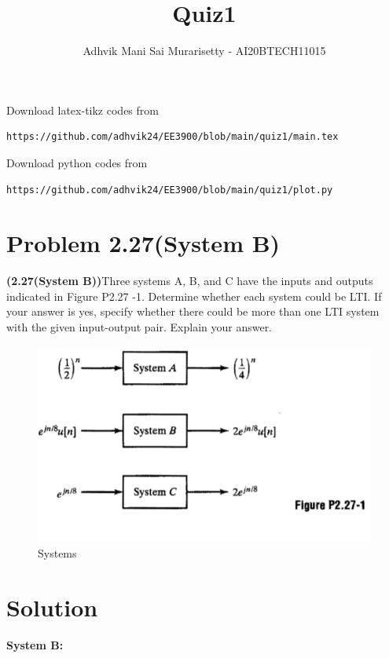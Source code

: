 \documentclass[journal,12pt,twocolumn]{IEEEtran}
\begin{document}
\vspace{3cm}
\title{Quiz1}
\author{Adhvik Mani Sai Murarisetty - AI20BTECH11015}
\maketitle
\newpage
\bigskip
\renewcommand{\thetable}{\theenumi}

Download latex-tikz codes from 
%
\begin{lstlisting}
https://github.com/adhvik24/EE3900/blob/main/quiz1/main.tex
\end{lstlisting}
%
Download python codes from 
%
\begin{lstlisting}
https://github.com/adhvik24/EE3900/blob/main/quiz1/plot.py
\end{lstlisting}
\section*{Problem 2.27(System B)}
\textbf{(2.27(System B))}Three systems A, B, and C have the inputs and outputs indicated in Figure P2.27 -1. Determine whether each system could be LTI. If your answer is yes, specify whether there could
be more than one LTI system with the given input-output pair. Explain your answer. 

\begin{figure}[!htp]
    \centering
    \includegraphics[width = \columnwidth]{q1.PNG}
    \caption{Systems}
    \label{f0}
\end{figure}

\section*{Solution}
\textbf{System B:}
\end{document}
